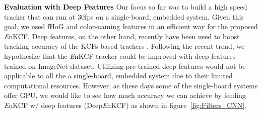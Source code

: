 \documentclass[10pt,twocolumn,letterpaper]{article}
\begin{document}
\textbf{Evaluation with Deep Features} Our focus so far was to build a
high speed tracker that can run at 30fps on a single-board, embedded
system. Given this goal, we used fHoG and color-naming features in an
efficient way for the proposed {\it E}nKCF. Deep features, on the
other hand, recently have been used to boost tracking accuracy of the
KCFs based trackers \cite{ma2015hierarchical,
  danelljan2015convolutional}. Following the recent trend, we hypothesize 
that the {\it E}nKCF tracker could be improved with deep features trained on ImageNet
dataset. Utilizing pre-trained deep features would not be applicable to
all the a single-board, embedded system due to their limited
computational resources. However, as these days some of the single-board
systems offer GPU, we would like to see how much accuracy we can
achieve by feeding {\it E}nKCF w/ deep features (Deep{\it E}nKCF) as shown in figure~\ref{fig:Filters_CNN}.
\end{document}
